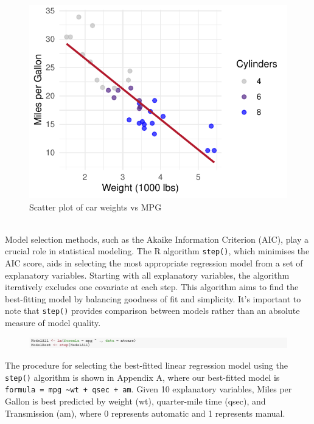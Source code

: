 \documentclass{article}\usepackage[]{graphicx}\usepackage[]{xcolor}
\makeatletter
\def\maxwidth{ %
  \ifdim\Gin@nat@width>\linewidth
    \linewidth
  \else
    \Gin@nat@width
  \fi
}
\newenvironment{knitrout}{}{} %
\makeatother
\begin{document}
\begin{knitrout}\scriptsize
{}\color{fgcolor}\begin{figure}[H]

{\centering \includegraphics[width=\maxwidth]{figure/beamer-scatter-plot-1} 

}

\caption[Scatter plot of car weights vs MPG]{Scatter plot of car weights vs MPG}\label{fig:scatter-plot}
\end{figure}

\end{knitrout}
\noindent 
\\Model selection methods, such as the Akaike Information Criterion (AIC), play a crucial role in statistical modeling. The R algorithm \texttt{step()}, which minimises the AIC score, aids in selecting the most appropriate regression model from a set of explanatory variables. Starting with all explanatory variables, the algorithm iteratively excludes one covariate at each step. This algorithm aims to find the best-fitting model by balancing goodness of fit and simplicity. It's important to note that \texttt{step()} provides comparison between models rather than an absolute measure of model quality.\\

\begin{figure}[H]
    \centering
    \includegraphics[width=1\textwidth]{image_reference/codeshoot.png}
    \label{fig:codeshoot}
\end{figure}
\noindent
The procedure for selecting the best-fitted linear regression model using the \texttt{step()} algorithm is shown in Appendix A, where our best-fitted model is \texttt{formula = mpg \textasciitilde wt + qsec + am}. Given 10 explanatory variables, Miles per Gallon is best predicted by weight (wt), quarter-mile time (qsec), and Transmission (am), where 0 represents automatic and 1 represents manual.\\
\noindent
\end{document}
